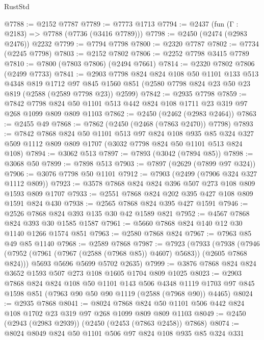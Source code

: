 \begin{lexlean}{RustStd}
\begin{coremodule}
@7788 := @2152 @7787
@7789 := @7773 @1713
@7794 := @2437 (fun (Γ : @2183) => @7788 (@7736 (@3416 @7789)))
@7798 := @2450 (@2474 (@2983 @2476)) @2232
@7799 := @7794 @7798
@7800 := @2320 @7787
@7802 := @7734 (@2245 @7798)
@7803 := @2152 @7802
@7806 := @2252 @7798 @3415 @7789
@7810 := @7800 (@7803 @7806) (@2494 @7661)
@7814 := @2320 @7802 @7806 (@2499 @7733)
@7841 := @2903
    @7798
    @824
    @824
    @108
    @50
    @1101
    @133
    @513
    @4348
    @819
    @1712
    @97
    @845
    @1560
    @851
    (@2580 @7798 @824 @23 @50 @23 @819 (@2588 (@2589 @7798 @23)) @2599)
@7842 := @2935 @7798
@7859 := @7842
    @7798
    @824
    @50
    @1101
    @513
    @442
    @824
    @108
    @1711
    @23
    @319
    @97
    @268
    @1099
    @809
    @809
    @1103
@7862 := @2450 (@2462 (@2983 @2464))
@7863 := @2455 @49
@7868 := @7862 (@2450 (@2468 (@7863 @2470)) @7798)
@7893 := @7842
    @7868
    @824
    @50
    @1101
    @513
    @97
    @824
    @108
    @935
    @85
    @324
    @327
    @509
    @1112
    @809
    @809
    @1707
    (@3032 @7798 @824 @50 @1101 @513 @824 @108)
@7894 := @3062 @513
@7897 := @7893 (@3042 (@7894 @85))
@7898 := @3068 @50
@7899 := @7898 @513
@7903 := @7897 (@2629 (@7899 @97 @324))
@7906 := @3076 @7798 @50 @1101
@7912 := @7903 (@2499 (@7906 @324 @327 @1112 @809))
@7923 := @3578 @7868 @824 @824 @396 @507 @273 @108 @809 @1593 @809 @1707
@7933 := @2551 @7868 @824 @202 @395 @427 @108 @809 @1591 @824 @430
@7938 := @2565 @7868 @824 @395 @427 @1591
@7946 := @2526 @7868 @824 @393 @135 @30 @42 @1589 @821
@7952 := @4567 @7868 @824 @393 @30 @1585 @1587
@7961 := @5660 @7868 @824 @140 @12 @30 @1140 @1266 @1574 @851
@7963 := @2580 @7868 @824
@7967 := @7963 @85 @49 @85 @1140
@7968 := @2589 @7868
@7987 := @7923
    (@7933
      (@7938 (@7946 (@7952 (@7961 (@7967 (@2588 (@7968 @85)) @4607) @5683)) (@2605 @7868 @824)))
      @5693
      @5696
      @5699
      @5702
      @2635)
@7999 := @3876 @7868 @824 @824 @3652 @1593 @507 @273 @108 @1605 @1704 @809 @1025
@8023 := @2903
    @7868
    @824
    @824
    @108
    @50
    @1101
    @143
    @506
    @4348
    @1119
    @1703
    @97
    @845
    @1598
    @851
    (@7963 @90 @50 @90 @1119 (@2588 (@7968 @90)) @4465)
@8024 := @2935 @7868
@8041 := @8024
    @7868
    @824
    @50
    @1101
    @506
    @442
    @824
    @108
    @1702
    @23
    @319
    @97
    @268
    @1099
    @809
    @809
    @1103
@8049 := @2450 (@2943 (@2983 @2939)) (@2450 (@2453 (@7863 @2458)) @7868)
@8074 := @8024
    @8049
    @824
    @50
    @1101
    @506
    @97
    @824
    @108
    @935
    @85
    @324
    @331

\end{coremodule}
\end{lexlean}
